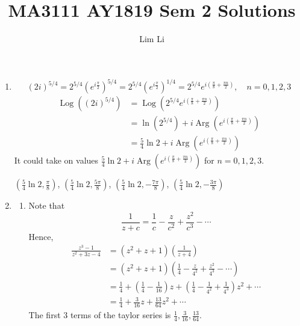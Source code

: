 \documentclass{article}
\title{MA3111 AY1819 Sem 2 Solutions}
\author{Lim Li}
\newcommand{\paren}[1]{\left(#1\right)}
\DeclareMathOperator{\Arg}{Arg}
\DeclareMathOperator{\Log}{Log}
\begin{document}
\maketitle
\begin{enumerate}
\item
\[(2i)^{5/4} = 2^{5/4}(e^{i\frac{\pi}{2}})^{5/4} = 2^{5/4} (e^{i\frac{\pi}{2}})^{1/4} = 2^{5/4} e^{i(\frac{\pi}{8} + \frac{\pi n}{2})}, \quad n=0,1,2,3\]
\begin{align*}
\Log ((2i)^{5/4}) &= \Log(2^{5/4} e^{i(\frac{\pi}{8} + \frac{\pi n}{2})}) \\
    &= \ln(2^{5/4}) + i\Arg(e^{i(\frac{\pi}{8} + \frac{\pi n}{2})}) \\
    &= \frac{5}{4} \ln 2 + i\Arg(e^{i(\frac{\pi}{8} + \frac{\pi n}{2})})
\end{align*}
It could take on values $\frac{5}{4} \ln 2 + i\Arg(e^{i(\frac{\pi}{8} + \frac{\pi n}{2})})$ for $n=0,1,2,3$.

$(\frac{5}{4} \ln 2 , \frac{\pi}{8})$, $(\frac{5}{4} \ln 2 , \frac{5\pi}{8})$, $(\frac{5}{4} \ln 2 , -\frac{7\pi}{8})$, $(\frac{5}{4} \ln 2 , -\frac{3\pi}{8})$
\item
\begin{enumerate}
\item Note that
\[\frac{1}{z+c} = \frac{1}{c} - \frac{z}{c^2} + \frac{z^2}{c^3} - \cdots\]
Hence,
\begin{align*}
\frac{z^3-1}{z^2+3z-4} &= (z^2+z+1)\paren{\frac{1}{z+4}} \\
    &= (z^2+z+1)\paren{\frac{1}{4} - \frac{z}{4^2} + \frac{z^2}{4^3} - \cdots} \\
    &= \frac{1}{4} + (\frac{1}{4} - \frac{1}{16})z + (\frac{1}{4} - \frac{1}{4^2} + \frac{1}{4^3})z^2 + \cdots \\
    &= \frac{1}{4} + \frac{3}{16} z + \frac{13}{64} z^2 + \cdots
\end{align*}
The first 3 terms of the taylor series is $\frac{1}{4}, \frac{3}{16}, \frac{13}{64}$.


\end{enumerate}
\end{enumerate}
\end{document}
